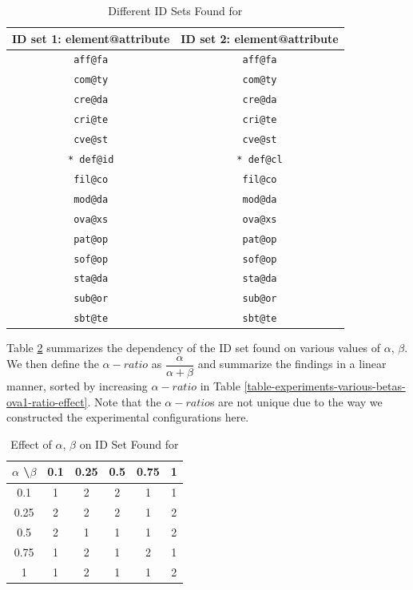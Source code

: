 \begin{table}
  \caption{Different ID Sets Found for }
  \bigskip
  \label{table-experiments-various-betas-ova1}
  \centering
  \begin{tabular}{c || c}
    ID set \textbf{1}: element@attribute & ID set \textbf{2}: element@attribute \\
    \hline
    \texttt{aff@fa} & \texttt{aff@fa} \\
    \texttt{com@ty} & \texttt{com@ty} \\
    \texttt{cre@da} & \texttt{cre@da} \\
    \texttt{cri@te} & \texttt{cri@te} \\
    \texttt{cve@st} & \texttt{cve@st} \\
    \texttt{* def@id} & \texttt{* def@cl} \\
    \texttt{fil@co} & \texttt{fil@co} \\
    \texttt{mod@da} & \texttt{mod@da} \\
    \texttt{ova@xs} & \texttt{ova@xs} \\
    \texttt{pat@op} & \texttt{pat@op} \\
    \texttt{sof@op} & \texttt{sof@op} \\
    \texttt{sta@da} & \texttt{sta@da} \\
    \texttt{sub@or} & \texttt{sub@or} \\
    \texttt{sbt@te} & \texttt{sbt@te} \\
  \end{tabular}
\end{table}

Table \ref{table-experiments-various-betas-ova1-effect} summarizes the dependency of the ID set found on various values of $\alpha$, $\beta$. We then define the $\alpha-ratio$ as $ \dfrac{\alpha}{\alpha + \beta} $ and summarize the findings in a linear manner, sorted by increasing $\alpha-ratio$ in Table \ref{table-experiments-various-betas-ova1-ratio-effect}. Note that the $\alpha-ratio$s are not unique due to the way we constructed the experimental configurations here.

\begin{table}
  \caption{Effect of $\alpha$, $\beta$ on ID Set Found for }
  \bigskip
  \label{table-experiments-various-betas-ova1-effect}
  \centering
  \begin{tabular}{c | c  c  c  c  c}
    $\alpha$ \textbackslash $\beta$ & 0.1 & 0.25 & 0.5 & 0.75 & 1 \\
    \hline
    0.1  & 1 & 2 & 2 & 1 & 1 \\
    0.25 & 2 & 2 & 2 & 1 & 2 \\
    0.5  & 2 & 1 & 1 & 1 & 2 \\
    0.75 & 1 & 2 & 1 & 2 & 1 \\
    1    & 1 & 2 & 1 & 1 & 2 \\
  \end{tabular}
\end{table}

